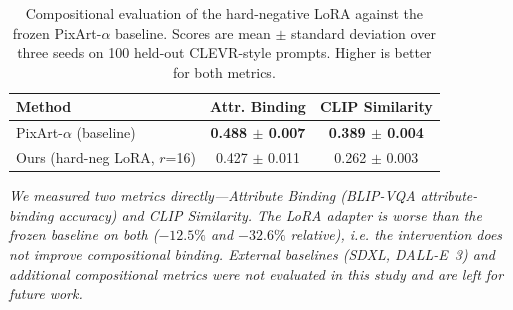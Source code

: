 \begin{table}[t]
\centering
\caption{Compositional evaluation of the hard-negative LoRA against the frozen
PixArt-$\alpha$ baseline. Scores are mean $\pm$ standard deviation over three
seeds on 100 held-out CLEVR-style prompts. Higher is better for both metrics.}
\label{tab:comp-results}
\begin{tabular}{lcc}
\hline
\textbf{Method} & \textbf{Attr. Binding} & \textbf{CLIP Similarity} \\
\hline
PixArt-$\alpha$ (baseline) & \textbf{0.488 $\pm$ 0.007} & \textbf{0.389 $\pm$ 0.004} \\
Ours (hard-neg LoRA, $r$=16) & 0.427 $\pm$ 0.011 & 0.262 $\pm$ 0.003 \\
\hline
\end{tabular}

\vspace{2pt}
{\footnotesize\raggedright\textit{We measured two metrics directly---Attribute
Binding (BLIP-VQA attribute-binding accuracy) and CLIP Similarity. The LoRA
adapter is \emph{worse} than the frozen baseline on both ($-12.5\%$ and
$-32.6\%$ relative), i.e. the intervention does not improve compositional
binding. External baselines (SDXL, DALL-E~3) and additional compositional
metrics were not evaluated in this study and are left for future work.}\par}
\end{table}
